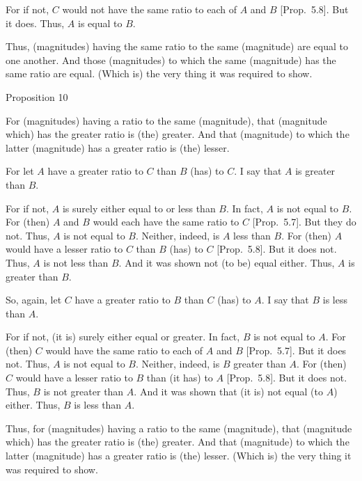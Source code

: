 For if not, $C$ would not have the same ratio to each of $A$ and $B$ [Prop.~5.8]. But it does. Thus, $A$ is equal to $B$.

Thus, (magnitudes) having the same ratio to the same (magnitude) are equal to one another. And those (magnitudes) to which the same (magnitude)
has the same ratio are equal. (Which is) the very thing it was required to show.


\begin{center}
{\large Proposition 10}
\end{center}

For (magnitudes) having a ratio to the same (magnitude), that (magnitude which) has the
greater ratio is (the) greater. And that (magnitude) to which the latter (magnitude) has a greater ratio is (the)
lesser.

\epsfysize=0.5in
\centerline{}

For let $A$ have a greater ratio to $C$ than $B$ (has) to $C$. I say that $A$ is greater than $B$.

For if not, $A$ is surely either equal to or less than $B$. In fact, $A$ is not
equal to $B$. For (then) $A$ and $B$ would each have the same ratio to $C$ 
 [Prop.~5.7]. But they do not. Thus, $A$
 is not equal to $B$. Neither, indeed, is $A$ less than $B$. For (then)
 $A$ would have a lesser ratio to $C$ than $B$ (has) to $C$ [Prop.~5.8]. But it does not. Thus, $A$ is not less
 than $B$. And it was shown not (to be) equal either. Thus, $A$ is greater than $B$.
 
 So, again, let $C$ have a greater ratio to $B$ than $C$ (has) to $A$. I say that
 $B$ is less than $A$.
 
 For if not, (it is) surely either equal or greater. In fact, $B$ is not equal to 
 $A$. For (then) $C$ would have the same ratio to each of $A$ and $B$  [Prop.~5.7]. But it does not. Thus, $A$ is not equal to $B$. 
 Neither, indeed, is $B$ greater than $A$. For (then) $C$ would have a lesser
 ratio to $B$ than (it has) to $A$ [Prop.~5.8].
 But it does not. Thus, $B$ is not greater than $A$. And it was shown that
  (it is) not equal (to $A$) either. Thus, $B$ is less than $A$.
  
 Thus, for (magnitudes) having a ratio to the same (magnitude), that (magnitude which)
 has the greater  ratio is (the) greater. And that (magnitude) to which the latter (magnitude) has a greater ratio is (the)
lesser. (Which is) the very thing it was required to show.

